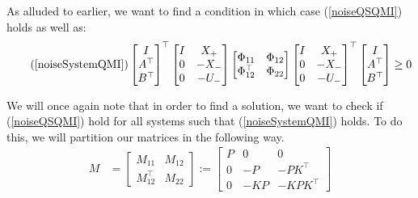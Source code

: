 As alluded to earlier, we want to find a condition in which case (\ref{noiseQSQMI}) holds as well as:
\begin{equation} \tag{\ref{noiseSystemQMI}}
\begin{bmatrix} I \\ A^\top \\ B^\top \end{bmatrix}^\top
\begin{bmatrix} I&X_+ \\ 0 & -X_- \\ 0&-U_- \end{bmatrix}
\begin{bmatrix} \Phi_{11} & \Phi_{12} \\ \Phi_{12}^\top & \Phi_{22} \end{bmatrix}
\begin{bmatrix} I&X_+ \\ 0 & -X_- \\ 0&-U_- \end{bmatrix}^\top
\begin{bmatrix} I \\ A^\top \\ B^\top \end{bmatrix} \geq 0
\end{equation}

We will once again note that in order to find a solution, we want to check if (\ref{noiseQSQMI}) hold for all systems such that (\ref{noiseSystemQMI}) holds. To do this, we will partition our matrices in the following way.
\begin{align*} 
	M &= 
	\left[ \begin{array}{c|c}
		M_{11} & M_{12} \\ \hline M_{12}^\top & M_{22}
	\end{array} \right] 
	:=
	\left[ \begin{array}{c|cc}
	P&0&0 \\ \hline 0 & -P & -PK^\top \\ 0 & -KP & -KPK^\top
	\end{array} \right]
\end{align*}

